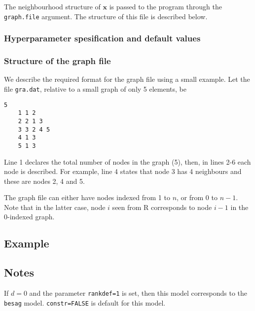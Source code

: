 \documentclass[a4paper,11pt]{article}
\begin{document}
The neighbourhood structure of $\mathbf{x}$ is passed to the program
through the {\tt graph.file} argument.  The structure of this file is
described below.

\subsubsection*{Hyperparameter spesification and default values}



\subsubsection*{Structure of the graph file}

We describe the required format for the graph file using a small
example. Let the file {\tt gra.dat}, relative to a small graph of only
5 elements, be
\begin{lstlisting}[basicstyle=\footnotesize]
    5
    1 1 2
    2 2 1 3
    3 3 2 4 5 
    4 1 3
    5 1 3
\end{lstlisting}
Line 1 declares the total number of nodes in the graph (5), then, in
lines 2-6 each node is described. For example, line 4 states that node
3 has 4 neighbours and these are nodes 2, 4 and 5.

The graph file can either have nodes indexed from 1 to $n$, or from 0
to $n-1$. Note that in the latter case, node $i$ seen from R
corresponds to node $i-1$ in the 0-indexed graph.



\subsection*{Example}



\subsection*{Notes}

If $d=0$ and the parameter \texttt{rankdef=1} is set, then this model
corresponds to the \texttt{besag} model. \texttt{constr=FALSE} is
default for this model.
\end{document}
